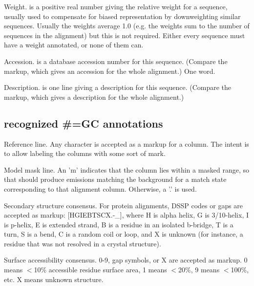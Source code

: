 \begin{sreitems}{}
\item [\monob{WT  <f>}]
        Weight.  is a positive real number giving the
        relative weight for a sequence, usually used to compensate
        for biased representation by downweighting similar sequences.   
        Usually the weights average 1.0 (e.g. the weights sum to
        the number of sequences in the alignment) but this is not
        required. Either every sequence must have a weight annotated, 
        or none of them can.  

\item [\monob{AC  <s>}]
        Accession.  is a database accession number for 
        this sequence. (Compare the  markup, which gives
        an accession for the whole alignment.) One word. 
        
\item [\monob{DE  <s>}]
        Description.  is one line giving a description for
        this sequence. (Compare the  markup, which gives
        a description for the whole alignment.)
\end{sreitems}


\subsection{recognized \#=GC annotations}

\begin{sreitems}{}

\item [\monob{RF}]
        Reference line. Any character is accepted as a markup for a
        column. The intent is to allow labeling the columns with some
        sort of mark.
        
\item [\monob{MM}]
        Model mask line. An 'm' indicates that the column lies within a 
        masked range, so that  should produce emissions matching
        the background for a match state corresponding to that alignment column.
        Otherwise, a '.' is used.
                
\item [\monob{SS\_cons}]
        Secondary structure consensus. For protein alignments,
        DSSP codes or gaps are accepted as markup: [HGIEBTSCX.-\_], where
        H is alpha helix, G is 3/10-helix, I is p-helix, E is extended
        strand, B is a residue in an isolated b-bridge, T is a turn, 
        S is a bend, C is a random coil or loop, and X is unknown
        (for instance, a residue that was not resolved in a crystal
        structure). 

\item [\monob{SA\_cons}]
        Surface accessibility consensus. 0-9, gap symbols, or X are
        accepted as markup. 0 means $<$10\% accessible residue surface
        area, 1 means $<$20\%, 9 means $<$100\%, etc. X means unknown
        structure.
\end{sreitems}


